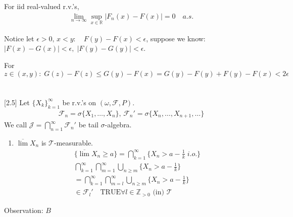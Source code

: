 \documentclass[11pt]{article}
\begin{document}
\begin{theorem}
    For iid real-valued r.v.'s,
    \begin{align*}
        \lim_{n \to \infty}\sup_{x \in \mathbb{R}}|F_n(x) - F(x)| = 0 \quad a.s.
    \end{align*}
\end{theorem}

Notice let $\epsilon > 0,\, x < y: \quad F(y)-F(x) < \epsilon$, suppose we know:
$|F(x) - G(x)| < \epsilon, \; |F(y) - G(y)| < \epsilon$.

For $z \in (x,y): \; G(z) - F(z) \le G(y) - F(x) = G(y) - F(y) + F(y) - F(x) < 2\epsilon$

\section{}[2.5]
Let $\{ X_k \}_{k=1}^{\infty}$ be r.v.'s on $(\omega, \mathcal{F}, P)$.
\begin{align*}
    \mathcal{F}_{n} = \sigma\{ X_1, \ldots ,X_n \},\, 
    \mathcal{F}_n' = \sigma \{ X_n, \ldots ,X_{n+1}, \ldots  \}
\end{align*}
We call $\mathcal{J} = \bigcap_{n=1}^{\infty}\mathcal{F}_{n}'$ be tail $\sigma$-algebra.

\begin{example}
    \begin{enumerate}
        \item $\overline{\lim}X_n$ is $\mathcal{T}$-measurable.
        \begin{align*}
            \{ \overline{\lim}X_n \ge a \} = \bigcap_{k=1}^{\infty}\{ X_n >
            a - \frac{1}{k} \;i.o. \}\\
            \bigcap_{k=1}^{\infty}\bigcap_{m=1}^{\infty}\bigcup_{n \ge m} \{ X_n > a - \frac{1}{k} \}\\
            = \bigcap_{k=1}^{\infty}\bigcap_{m=l}^{\infty}\bigcup_{n \ge m} \{ X_n > a - \frac{1}{k} \}\\
            \in \mathcal{F}_{l}' \quad \text{TRUE} \forall  l \in \mathbb{Z}_{>0} \text{ (in) }\mathcal{T}
        \end{align*}
    \end{enumerate}
    Observation: $B$
\end{example}
\end{document}
